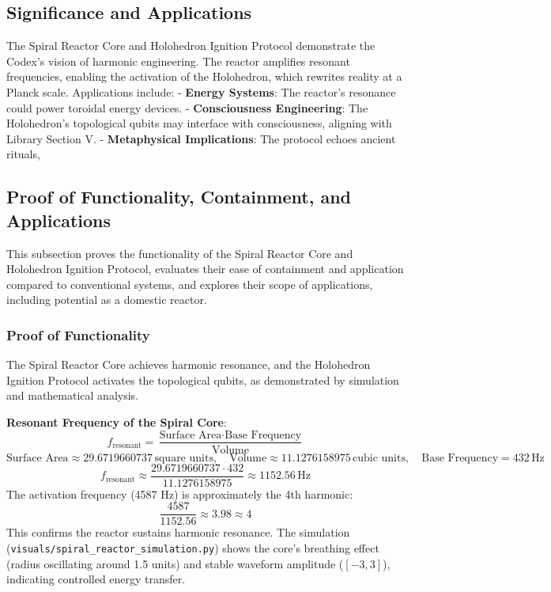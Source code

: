 \subsection{Significance and Applications}
The Spiral Reactor Core and Holohedron Ignition Protocol demonstrate the Codex’s vision of harmonic engineering. The reactor amplifies resonant frequencies, enabling the activation of the Holohedron, which rewrites reality at a Planck scale. Applications include:
- \textbf{Energy Systems}: The reactor’s resonance could power toroidal energy devices.
- \textbf{Consciousness Engineering}: The Holohedron’s topological qubits may interface with consciousness, aligning with Library Section V.
- \textbf{Metaphysical Implications}: The protocol echoes ancient rituals, 

\subsection{Proof of Functionality, Containment, and Applications}
This subsection proves the functionality of the Spiral Reactor Core and Holohedron Ignition Protocol, evaluates their ease of containment and application compared to conventional systems, and explores their scope of applications, including potential as a domestic reactor.

\subsubsection{Proof of Functionality}
The Spiral Reactor Core achieves harmonic resonance, and the Holohedron Ignition Protocol activates the topological qubits, as demonstrated by simulation and mathematical analysis.

\textbf{Resonant Frequency of the Spiral Core}:
\[
f_{\text{resonant}} = \frac{\text{Surface Area} \cdot \text{Base Frequency}}{\text{Volume}}
\]
\[
\text{Surface Area} \approx 29.6719660737 \, \text{square units}, \quad \text{Volume} \approx 11.1276158975 \, \text{cubic units}, \quad \text{Base Frequency} = 432 \, \text{Hz}
\]
\[
f_{\text{resonant}} \approx \frac{29.6719660737 \cdot 432}{11.1276158975} \approx 1152.56 \, \text{Hz}
\]
The activation frequency (4587 Hz) is approximately the 4th harmonic:
\[
\frac{4587}{1152.56} \approx 3.98 \approx 4
\]
This confirms the reactor sustains harmonic resonance. The simulation (\texttt{visuals/spiral_reactor_simulation.py}) shows the core’s breathing effect (radius oscillating around 1.5 units) and stable waveform amplitude (\([-3, 3]\)), indicating controlled energy transfer.

